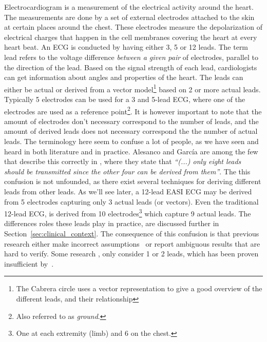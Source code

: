 Electrocardiogram is a measurement of the electrical activity around the heart. The measurements are done by a set of external electrodes attached to the skin at certain places around the chest. These electrodes measure the depolarization of electrical charges that happen in the cell membranes covering the heart at every heart beat. An ECG is conducted by having either 3, 5 or 12 leads. The term lead refers to the voltage difference \textit{between a given pair} of electrodes, parallel to the direction of the lead. Based on the signal strength of each lead, cardiologists can get information about angles and properties of the heart. The leads can either be actual or derived from a vector model\footnote{ The Cabrera circle uses a vector representation to give a good overview of the different leads, and their relationship} based on 2 or more actual leads. Typically 5 electrodes can be used for a 3 and 5-lead ECG, where one of the electrodes are used as a reference point\footnote{ Also referred to as \emph{ground}.}. It is however important to note that the amount of electrodes don't necessary correspond to the number of leads, and the amount of derived leads does not necessary correspond the the number of actual leads. The terminology here seem to confuse a lot of people, as we have seen and heard in both literature and in practice. Alesanco and García are among the few that describe this correctly in \cite{Alesanco:2010kc}, where they state that \textit{``(...) only eight leads should be transmitted since the other four can be derived from them''}. The this confusion is not unfounded, as there exist several techniques for deriving different leads from other leads. As we'll see later, a 12-lead EASI ECG may be derived from 5 electrodes capturing only 3 actual leads (or vectors). Even the traditional 12-lead ECG, is derived from 10 electrodes\footnote{ One at each extremity (limb) and 6 on the chest.} which capture 9 actual leads. The differences roles these leads play in practice, are discussed further in Section~\ref{sec:clinical_context}. The consequence of this confusion is that previous research either make incorrect assumptions~\cite{jenniferporcello:2015wv} or report ambiguous results that are hard to verify. Some research \cite{yubin:2012tr, Lee:2009bu, Alesanco:2010kc}, only consider 1 or 2 leads, which has been proven insufficient by~\cite{Drew:1998wp}.

